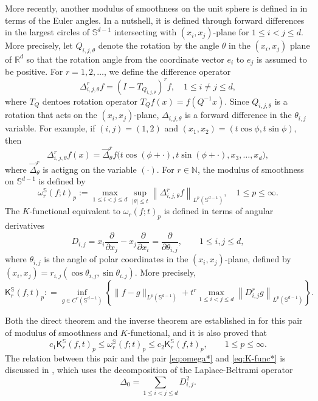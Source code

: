 \documentclass{amsart}
\theoremstyle{remark}
\def\sph{{\mathbb{S}^{d-1}}}
\def\t{{\theta}}
\def\NN{{\mathbb N}}
\def\RR{{\mathbb R}}
\def\SS{{\mathbb S}}
\def\sph{{\mathbb{S}^{d-1}}}
\def\sK{{\mathsf K}}
\def\t{{\theta}}
\def\NN{{\mathbb N}}
\def\RR{{\mathbb R}}
\def\SS{{\mathbb S}}
\begin{document}
More recently, another modulus of smoothness on the unit sphere is defined in \cite{DaiX2} in terms of the
Euler angles. In a nutshell, it is defined through forward differences in the largest circles of $\sph$ intersecting
with $(x_i, x_j)$-plane for $1\le i < j \le d$. More precisely, let $Q_{i,j, \t}$ denote the rotation by the angle $\t$
in the $(x_i,x_j)$ plane of $\RR^d$ so that the rotation angle from the coordinate vector $e_i$ to $e_j$ is assumed 
to be positive. For $r = 1,2,\ldots$, we define the difference operator
$$
  \Delta_{i,j,\t}^r f = \left(I - T_{Q_{i,j,\t}} \right)^r f, \quad 1 \le i \ne j \le d, 
$$
where $T_Q$ dentoes rotation operator $T_Q f(x)= f(Q^{-1}x)$. Since $Q_{i,j,\t}$ is a rotation that acts on the 
$(x_i, x_j)$-plane, $\Delta_{i,j,\t}$ is a forward difference in the $\t_{i,j}$ variable. For example, if $(i,j) = (1,2)$ 
and $(x_1,x_2) = (t \cos \phi, t \sin \phi)$, then 
\begin{equation}\label{eq:Delta_ijt}
  \Delta_{i,j,\t}^r f(x)  = \overrightarrow{\Delta}_\t^r f \big(t \cos (\phi+ \cdot), t \sin (\phi+ \cdot), x_3, \ldots, x_d\big), 
\end{equation}
where $\overrightarrow{\Delta}_\t^r$ is actigng on the variable $(\cdot)$. For $r \in \NN$, the modulus
of smoothness on $\sph$ is defined by \cite{DaiX2}
\begin{equation} \label{eq:o_rSph}
 \omega_r^\SS(f; t)_p := \max_{1\le i < j \le d} \sup_{|\t| \le t} \left \| \Delta_{i,j,\t}^r f\right\|_{L^p(\sph)}, \quad 1 \le p \le \infty.   
\end{equation}
The $K$-functional equivalent to $ \omega_r(f; t)_p$ is defined in terms of angular derivatives 
$$
  D_{i,j} = x_i  \frac{\partial}{\partial x_j} - x_j \frac{\partial}{\partial x_i} = \frac{\partial}{\partial \t_{i,j}},  \qquad 1 \le i,j \le d,
$$
where $\t_{i,j}$ is the angle of polar coordinates in the $(x_i,x_j)$-plane, defined by $(x_i,x_j) = r_{i,j} (\cos \t_{i,j},\sin \t_{i,j})$.
More precisely, 
\begin{equation} \label{eq:K_rSph}
 \sK_r^\SS (f, t)_{p}: = \inf_{g \in C^r(\sph)} \left \{ \|f-g\|_{L^p(\sph)} + t^r  \max_{1\le i < j \le d} \left\|D_{i,j}^r g \right\|_{L^p(\sph)} \right \}.
\end{equation}

Both the direct theorem and the inverse theorem are established in \cite{DaiX2} for this pair of modulus of smoothness 
and $K$-functional, and it is also proved that 
\begin{equation} \label{eq:o_rSph=K_rSph}
  c_1 \sK_r^\SS (f, t)_{p} \le  \omega_r^\SS(f; t)_p  \le c_2 \sK_r^\SS (f, t)_{p}, \qquad 1 \le p \le \infty. 
\end{equation}
The relation between this pair and the  pair \eqref{eq:omega*} and \eqref{eq:K-func*} is discussed in 
\cite{DaiX2}, which uses the decomposition of the Laplace-Beltrami operator \cite[(1.8.3)]{DaiX}
\begin{equation} \label{eq:Delta0=sum}
      \Delta_0 = \sum_{1 \le i< j \le d} D_{i,j}^2.
\end{equation}
\end{document}
